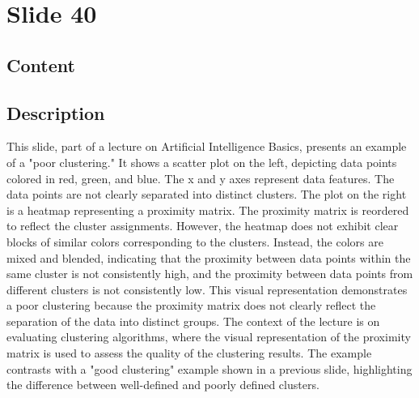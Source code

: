 \documentclass{article}%
\begin{document}
%
\newpage%
\section{Slide 40}%
\label{sec:Slide40}%
\subsection{Content}%
%
\subsection{Description}%
This slide, part of a lecture on Artificial Intelligence Basics, presents an example of a "poor clustering."  It shows a scatter plot on the left, depicting data points colored in red, green, and blue.  The x and y axes represent data features.  The data points are not clearly separated into distinct clusters.  The plot on the right is a heatmap representing a proximity matrix.  The proximity matrix is reordered to reflect the cluster assignments.  However, the heatmap does not exhibit clear blocks of similar colors corresponding to the clusters.  Instead, the colors are mixed and blended, indicating that the proximity between data points within the same cluster is not consistently high, and the proximity between data points from different clusters is not consistently low.  This visual representation demonstrates a poor clustering because the proximity matrix does not clearly reflect the separation of the data into distinct groups. The context of the lecture is on evaluating clustering algorithms, where the visual representation of the proximity matrix is used to assess the quality of the clustering results.  The example contrasts with a "good clustering" example shown in a previous slide, highlighting the difference between well-defined and poorly defined clusters.%
\end{document}
